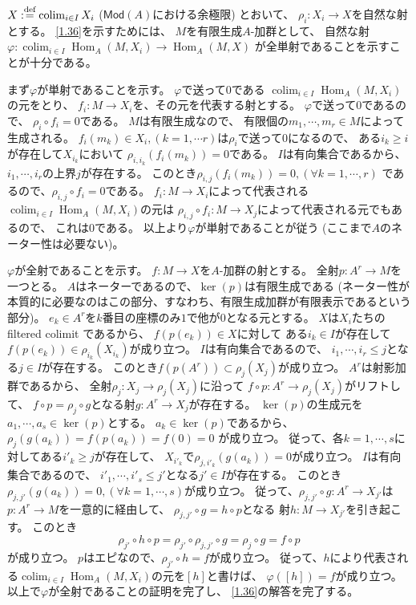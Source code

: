 \documentclass[uplatex,dvipdfmx]{jsarticle}
\makeatletter
\theoremstyle{definition}
\renewenvironment{proof}[1][\proofname]{
  \pushQED{\qed}%
  \normalfont \topsep6\p@\@plus6\p@\relax
  \trivlist
  \item[\hskip\labelsep
    #1\@addpunct{\textbf{.}}]\ignorespaces
}{%
  \popQED\endtrivlist\@endpefalse
}
\providecommand{\proofname}{証明}
\DeclareMathOperator{\Hom}{\mathrm{Hom}}
\DeclareMathOperator{\colim}{\mathrm{colim}}
\newcommand{\Mod}{\mathsf{Mod}}
\def\dfn{:\overset{\mbox{{\scriptsize def}}}{=}}
\makeatother
\begin{document}
\begin{proof}
  \(X\dfn \colim_{i\in I}X_i\) (\(\Mod(A)\)における余極限) とおいて、
  \(\rho_i:X_i\to X\)を自然な射とする。
  \autoref{1.36}を示すためには、
  \(M\)を有限生成\(A\)-加群として、
  自然な射\(\varphi: \colim_{i\in I}\Hom_A(M,X_i) \to \Hom_A(M,X)\)
  が全単射であることを示すことが十分である。

  まず\(\varphi\)が単射であることを示す。
  \(\varphi\)で送って\(0\)である
  \(\colim_{i\in I}\Hom_A(M,X_i)\)の元をとり、
  \(f_i:M\to X_i\)を、その元を代表する射とする。
  \(\varphi\)で送って\(0\)であるので、
  \(\rho_i\circ f_i = 0\)である。
  \(M\)は有限生成なので、
  有限個の\(m_1,\cdots, m_r\in M\)によって生成される。
  \(f_i(m_k)\in X_i, (k=1,\cdots r)\)は\(\rho_i\)で送って\(0\)になるので、
  ある\(i_k \geq i\)が存在して\(X_{i_k}\)において
  \(\rho_{i,i_k}(f_i(m_k)) = 0\)である。
  \(I\)は有向集合であるから、
  \(i_1,\cdots, i_r\)の上界\(j\)が存在する。
  このとき\(\rho_{i,j}(f_i(m_k)) = 0, (\forall k =1,\cdots,r)\)
  であるので、\(\rho_{i,j}\circ f_i = 0\)である。
  \(f_i:M\to X_i\)によって代表される\(\colim_{i\in I}\Hom_A(M,X_i)\)の元は
  \(\rho_{i,j}\circ f_i:M\to X_j\)によって代表される元でもあるので、
  これは\(0\)である。
  以上より\(\varphi\)が単射であることが従う
  (ここまで\(A\)のネーター性は必要ない)。

  \(\varphi\)が全射であることを示す。
  \(f:M\to X\)を\(A\)-加群の射とする。
  全射\(p:A^r\to M\)を一つとる。
  \(A\)はネーターであるので、\(\ker(p)\)は有限生成である
  (ネーター性が本質的に必要なのはこの部分、すなわち、有限生成加群が有限表示であるという部分)。
  \(e_k\in A^r\)を\(k\)番目の座標のみ\(1\)で他が\(0\)となる元とする。
  \(X\)は\(X_i\)たちの filtered colimit であるから、
  \(f(p(e_k))\in X\)に対して
  ある\(i_k\in I\)が存在して
  \(f(p(e_k)) \in \rho_{i_k}(X_{i_k})\)が成り立つ。
  \(I\)は有向集合であるので、
  \(i_1,\cdots, i_r \leq j\)となる\(j\in I\)が存在する。
  このとき\(f(p(A^r)) \subset \rho_j(X_j)\)が成り立つ。
  \(A^r\)は射影加群であるから、
  全射\(\rho_j:X_j\to \rho_j(X_j)\)に沿って
  \(f\circ p:A^r\to \rho_j(X_j)\)がリフトして、
  \(f\circ p = \rho_j \circ g\)となる射\(g:A^r\to X_j\)が存在する。
  \(\ker(p)\)の生成元を\(a_1,\cdots,a_s\in \ker(p)\)とする。
  \(a_k\in \ker(p)\)であるから、
  \(\rho_j(g(a_k)) = f(p(a_k)) = f(0) = 0\)
  が成り立つ。
  従って、各\(k = 1,\cdots, s\)に対してある\(i'_k\geq j\)が存在して、
  \(X_{i'_k}\)で\(\rho_{j,i'_k}(g(a_k)) = 0\)が成り立つ。
  \(I\)は有向集合であるので、
  \(i'_1,\cdots, i'_s \leq j'\)となる\(j'\in I\)が存在する。
  このとき\(\rho_{j,j'}(g(a_k)) = 0, (\forall k = 1,\cdots ,s)\)が成り立つ。
  従って、\(\rho_{j,j'}\circ g: A^r\to X_{j'}\)は
  \(p:A^r\to M\)を一意的に経由して、
  \(\rho_{j,j'}\circ g = h\circ p\)となる
  射\(h:M\to X_{j'}\)を引き起こす。
  このとき
  \[
  \rho_{j'}\circ h \circ p = \rho_{j'}\circ \rho_{j,j'}\circ g = \rho_j\circ g
  = f\circ p
  \]
  が成り立つ。
  \(p\)はエピなので、\(\rho_{j'}\circ h = f\)が成り立つ。
  従って、\(h\)により代表される\(\colim_{i\in I}\Hom_A(M,X_i)\)の元を\([h]\)と書けば、
  \(\varphi([h]) = f\)が成り立つ。
  以上で\(\varphi\)が全射であることの証明を完了し、
  \autoref{1.36}の解答を完了する。
\end{proof}
\end{document}
